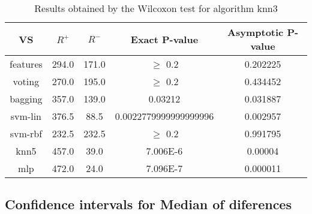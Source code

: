 \documentclass[a4paper,10pt]{article}
\begin{document}
\begin{table}[!htp]
\centering\small
\begin{tabular}{
|c|c|c|c|c|}
\hline
 VS & $R^{+}$ & $R^{-}$ & Exact P-value & Asymptotic P-value \\ \hline 
features & 294.0 & 171.0 & $\geq$ 0.2 & 0.202225\\ \hline 
voting & 270.0 & 195.0 & $\geq$ 0.2 & 0.434452\\ \hline 
bagging & 357.0 & 139.0 & 0.03212 & 0.031887\\ \hline 
svm-lin & 376.5 & 88.5 & 0.0022779999999999996 & 0.002957\\ \hline 
svm-rbf & 232.5 & 232.5 & $\geq$ 0.2 & 0.991795\\ \hline 
knn5 & 457.0 & 39.0 & 7.006E-6 & 0.00004\\ \hline 
mlp & 472.0 & 24.0 & 7.096E-7 & 0.000011\\ \hline 

\end{tabular}
\caption{Results obtained by the Wilcoxon test for algorithm knn3}
\end{table}

\subsection{Confidence intervals for Median of diferences}
\end{document}
